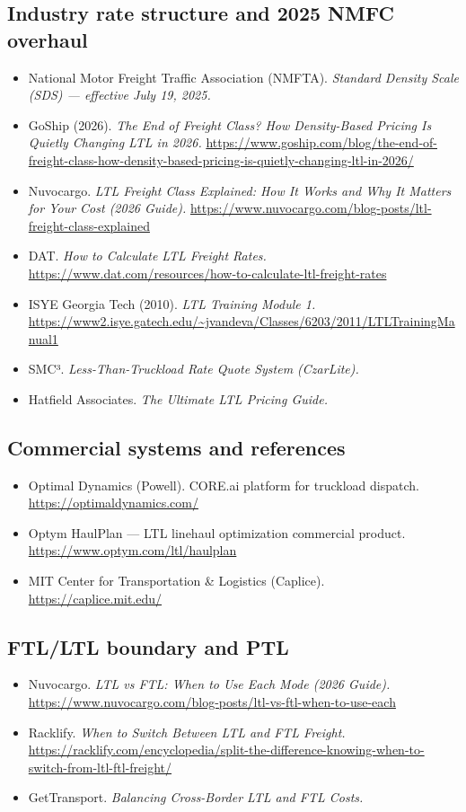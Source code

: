 \documentclass[11pt,a4paper]{article}
\theoremstyle{definition}
\begin{document}
\subsection*{Industry rate structure and 2025 NMFC overhaul}
\begin{itemize}[noitemsep]
  \item National Motor Freight Traffic Association (NMFTA). \emph{Standard Density Scale
        (SDS) --- effective July 19, 2025.}
  \item GoShip (2026). \emph{The End of Freight Class? How Density-Based Pricing Is
        Quietly Changing LTL in 2026.}
        \url{https://www.goship.com/blog/the-end-of-freight-class-how-density-based-pricing-is-quietly-changing-ltl-in-2026/}
  \item Nuvocargo. \emph{LTL Freight Class Explained: How It Works and Why It Matters for
        Your Cost (2026 Guide).}
        \url{https://www.nuvocargo.com/blog-posts/ltl-freight-class-explained}
  \item DAT. \emph{How to Calculate LTL Freight Rates.}
        \url{https://www.dat.com/resources/how-to-calculate-ltl-freight-rates}
  \item ISYE Georgia Tech (2010). \emph{LTL Training Module 1.}
        \url{https://www2.isye.gatech.edu/~jvandeva/Classes/6203/2011/LTLTrainingManual1}
  \item SMC³. \emph{Less-Than-Truckload Rate Quote System (CzarLite).}
  \item Hatfield Associates. \emph{The Ultimate LTL Pricing Guide.}
\end{itemize}

\subsection*{Commercial systems and references}
\begin{itemize}[noitemsep]
  \item Optimal Dynamics (Powell). CORE.ai platform for truckload dispatch.
        \url{https://optimaldynamics.com/}
  \item Optym HaulPlan --- LTL linehaul optimization commercial product.
        \url{https://www.optym.com/ltl/haulplan}
  \item MIT Center for Transportation \& Logistics (Caplice).
        \url{https://caplice.mit.edu/}
\end{itemize}

\subsection*{FTL/LTL boundary and PTL}
\begin{itemize}[noitemsep]
  \item Nuvocargo. \emph{LTL vs FTL: When to Use Each Mode (2026 Guide).}
        \url{https://www.nuvocargo.com/blog-posts/ltl-vs-ftl-when-to-use-each}
  \item Racklify. \emph{When to Switch Between LTL and FTL Freight.}
        \url{https://racklify.com/encyclopedia/split-the-difference-knowing-when-to-switch-from-ltl-ftl-freight/}
  \item GetTransport. \emph{Balancing Cross-Border LTL and FTL Costs.}
\end{itemize}
\end{document}
